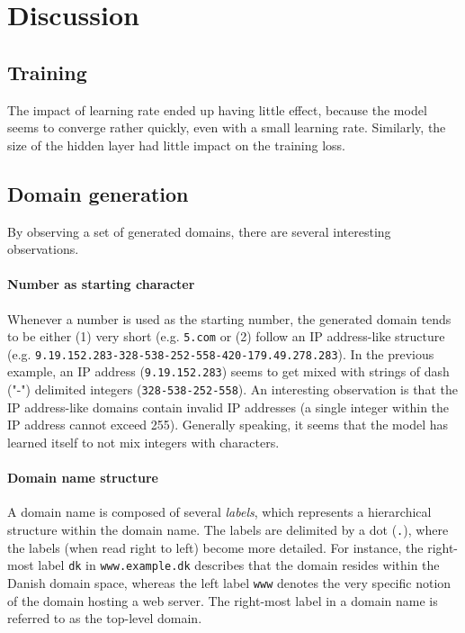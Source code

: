 \section{Discussion}

\subsection{Training}
The impact of learning rate ended up having little effect, because the model seems to converge rather quickly, even with a small learning rate.
Similarly, the size of the hidden layer had little impact on the training loss.

\subsection{Domain generation}
By observing a set of generated domains, there are several interesting observations.

\paragraph{Number as starting character}
Whenever a number is used as the starting number, the generated domain tends to be either (1) very short (e.g. {\tt 5.com} or (2) follow an IP address-like structure (e.g. {\tt 9.19.152.283-328-538-252-558-420-179.49.278.283}).
In the previous example, an IP address ({\tt 9.19.152.283}) seems to get mixed with strings of dash ("-") delimited integers ({\tt 328-538-252-558}).
An interesting observation is that the IP address-like domains contain invalid IP addresses (a single integer within the IP address cannot exceed 255).
Generally speaking, it seems that the model has learned itself to not mix integers with characters.

\paragraph{Domain name structure}
A domain name is composed of several {\it labels}, which represents a hierarchical structure within the domain name.
The labels are delimited by a dot ({\tt .}), where the labels (when read right to left) become more detailed. 
For instance, the right-most label {\tt dk} in {\tt www.example.dk} describes that the domain resides within the Danish domain space, whereas the left label {\tt www} denotes the very specific notion of the domain hosting a web server.
The right-most label in a domain name is referred to as the top-level domain.

